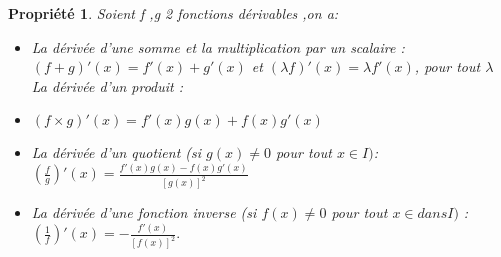 \documentclass[a4paper,12pt]{article} %
\newtheorem{propriete}{Propriété}[section]
\begin{document}
	  \begin{propriete}
	  	Soient f ,g 2 fonctions dérivables ,on a:
	  	\begin{itemize}
	  		
	  	\item La dérivée d'une somme et la multiplication par un scalaire :
	  	$(f + g)'(x) = f'(x) + g'(x)$ et $  (\lambda f)'(x) = \lambda f'(x)$, pour tout  $\lambda$
	  	 La dérivée d'un produit :
	  	\item 
	  	$(f \times g)'(x) = f'(x)g(x) + f(x)g'(x)$
	  	
	  	 \item La dérivée d'un quotient (si $g(x) \neq 0$ pour tout $x \in I) $:
	  	$(\frac{f}{g})'(x) = \frac{f'(x)g(x) - f(x)g'(x)}{[g(x)]^2}$
	  	
	  	\item La dérivée d'une fonction inverse (si $f(x) \neq 0$ pour tout $x \in dans I)$ :
	  	$(\frac{1}{f})'(x) = -\frac{f'(x)}{[f(x)]^2}.$
	 
	  \end{itemize}
	 \end{propriete}
	   
	   	
\end{document}
